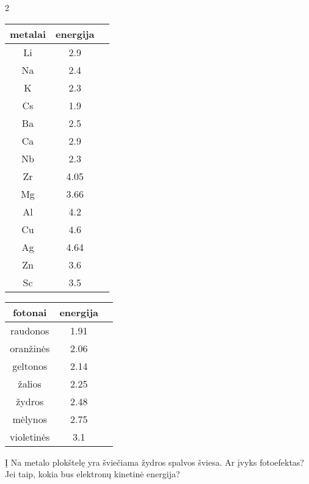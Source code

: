 \documentclass{exam}
\begin{document}
\begin{questions}
	\raggedcolumns\begin{multicols}             {2} 
\begin{center}
        \begin{tabular}{ |c|c|c| } 
        \hline 
metalai & energija \\ 
 \hline Li & 2.9 \\ 
 \hline Na & 2.4 \\ 
 \hline K & 2.3 \\ 
 \hline Cs & 1.9 \\ 
 \hline Ba & 2.5 \\ 
 \hline Ca & 2.9 \\ 
 \hline Nb & 2.3 \\ 
 \hline Zr & 4.05 \\ 
 \hline Mg & 3.66 \\ 
 \hline Al & 4.2 \\ 
 \hline Cu & 4.6 \\ 
 \hline Ag & 4.64 \\ 
 \hline Zn & 3.6 \\ 
 \hline Sc & 3.5 \\ 
 \hline  
 \end{tabular} 
 \end{center} 
\begin{center}
        \begin{tabular}{ |c|c|c| } 
        \hline 
fotonai & energija \\ 
 \hline raudonos & 1.91 \\ 
 \hline oranžinės & 2.06 \\ 
 \hline geltonos & 2.14 \\ 
 \hline žalios & 2.25 \\ 
 \hline žydros & 2.48 \\ 
 \hline mėlynos & 2.75 \\ 
 \hline violetinės & 3.1 \\ 
 \hline  
 \end{tabular} 
 \end{center} 
\end{multicols} 

	\question Į Na metalo plokštelę yra šviečiama žydros spalvos šviesa. Ar įvyks fotoefektas? Jei taip, kokia bus elektronų kinetinė energija?

	\end{questions}
	
\end{document}
